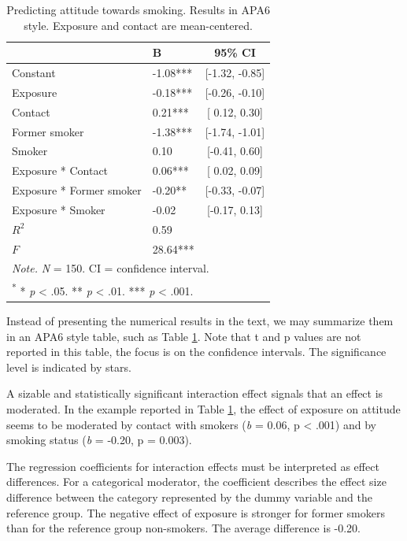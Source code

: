 \documentclass[a4paper]{book}
\theoremstyle{definition}
\theoremstyle{definition}
\theoremstyle{definition}
\theoremstyle{remark}
\begin{document}
\begin{table}

\caption{\label{tab:report-moderation-table}Predicting attitude towards smoking. Results in APA6 style. Exposure and contact are mean-centered.}
\centering
\fontsize{8}{8}\selectfont
\begin{tabular}[t]{llc}
\hline
  & B & 95\% CI\\
\hline
Constant & -1.08*** & [-1.32, -0.85]\\
Exposure & -0.18*** & [-0.26, -0.10]\\
Contact & 0.21*** & [ 0.12,  0.30]\\
Former smoker & -1.38*** & [-1.74, -1.01]\\
Smoker & 0.10 & [-0.41,  0.60]\\
Exposure * Contact & 0.06*** & [ 0.02,  0.09]\\
Exposure * Former smoker & -0.20** & [-0.33, -0.07]\\
Exposure * Smoker & -0.02 & [-0.17,  0.13]\\
\hline
$R^{2}$ & 0.59 & \\
$F$ & 28.64*** & \\
\hline
\multicolumn{3}{l}{\textit{Note.} \textit{N} = 150. CI = confidence interval.}\\
\multicolumn{3}{l}{\textsuperscript{*} * \textit{p} < .05. ** \textit{p} < .01. *** \textit{p} < .001.}\\
\end{tabular}
\end{table}

Instead of presenting the numerical results in the text, we may
summarize them in an APA6 style table, such as Table
\ref{tab:report-moderation-table}. Note that t and p values are not
reported in this table, the focus is on the confidence intervals. The
significance level is indicated by stars.

A sizable and statistically significant interaction effect signals that
an effect is moderated. In the example reported in Table
\ref{tab:report-moderation-table}, the effect of exposure on attitude
seems to be moderated by contact with smokers (\emph{b} = 0.06, p
\textless{} .001) and by smoking status (\emph{b} = -0.20, p = 0.003).

The regression coefficients for interaction effects must be interpreted
as effect differences. For a categorical moderator, the coefficient
describes the effect size difference between the category represented by
the dummy variable and the reference group. The negative effect of
exposure is stronger for former smokers than for the reference group
non-smokers. The average difference is -0.20.
\end{document}

